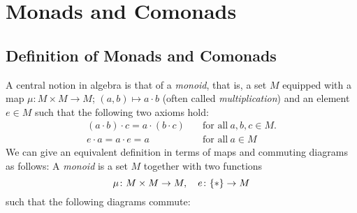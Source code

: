 \chapter{Monads and Comonads}
\section{Definition of Monads and Comonads}
A central notion in algebra is that of a \textit{monoid},
that is, a set $M$ equipped with a map 
$\mu \colon M \times M \to M$; $(a,b) \mapsto a \cdot b$ 
(often called \textit{multiplication}) and an element $e \in M$
such that the following two axioms hold:
\begin{align}
    \label{eq: associativity for a monoid}  \tag{associativity} 
    (a \cdot b) \cdot c = a \cdot (b \cdot c) 
    \quad &\text{for all} \ a,b,c \in M. \\
    \label{eq: identity element for a monoid} \tag{identity element}
    e \cdot a = a \cdot e = a \quad &\text{for all} \ a \in M 
\end{align}
We can give an equivalent definition in terms of maps and commuting diagrams as follows:
A \textit{monoid} is a set $M$ together with two functions 
\[
    \mu \colon M \times M \to M, \quad 
    e \colon \{\ast\} \to M
\]
such that the following diagrams commute: \\

\begin{figure}[H]
    \centering
    \begin{subfigure}{0.4\textwidth}
    \centering
    \end{subfigure}
    \hspace{2em}
    \begin{subfigure}{0.4\textwidth}
    \centering
    \end{subfigure}
    \end{figure}


